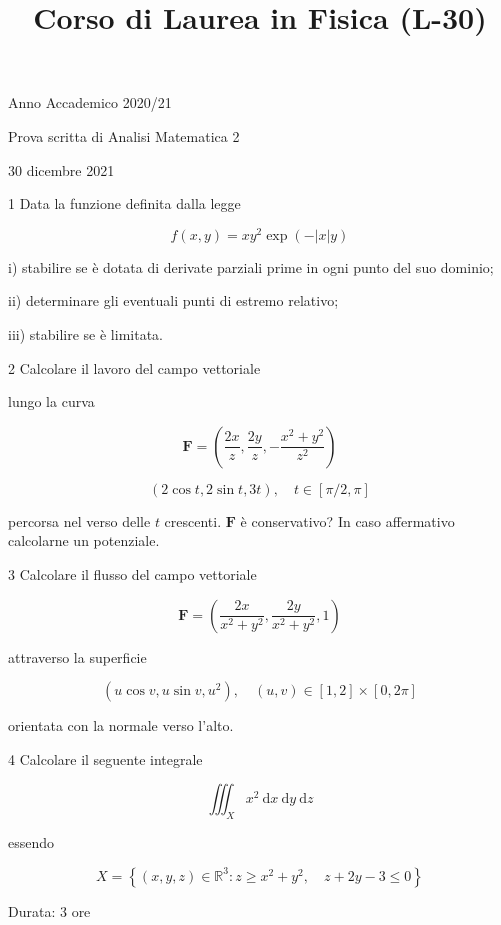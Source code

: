 \documentclass[10pt]{article}
\title{Corso di Laurea in Fisica (L-30) }
\author{}
\date{}
\begin{document}
\maketitle
Anno Accademico 2020/21

Prova scritta di Analisi Matematica 2

30 dicembre 2021

1 Data la funzione definita dalla legge

\[
f(x, y)=x y^{2} \exp (-|x| y)
\]

i) stabilire se è dotata di derivate parziali prime in ogni punto del suo dominio;

ii) determinare gli eventuali punti di estremo relativo;

iii) stabilire se è limitata.

2 Calcolare il lavoro del campo vettoriale

lungo la curva

\[
\mathbf{F}=\left(\frac{2 x}{z}, \frac{2 y}{z},-\frac{x^{2}+y^{2}}{z^{2}}\right)
\]

\[
(2 \cos t, 2 \sin t, 3 t), \quad t \in[\pi / 2, \pi]
\]

percorsa nel verso delle \(t\) crescenti. \(\mathbf{F}\) è conservativo? In caso affermativo calcolarne un potenziale.

3 Calcolare il flusso del campo vettoriale

\[
\mathbf{F}=\left(\frac{2 x}{x^{2}+y^{2}}, \frac{2 y}{x^{2}+y^{2}}, 1\right)
\]

attraverso la superficie

\[
\left(u \cos v, u \sin v, u^{2}\right), \quad(u, v) \in[1,2] \times[0,2 \pi]
\]

orientata con la normale verso l'alto.

4 Calcolare il seguente integrale

\[
\iiint_{X} x^{2} \mathrm{~d} x \mathrm{~d} y \mathrm{~d} z
\]

essendo

\[
X=\left\{(x, y, z) \in \mathbb{R}^{3}: z \geq x^{2}+y^{2}, \quad z+2 y-3 \leq 0\right\}
\]

Durata: 3 ore
\end{document}

